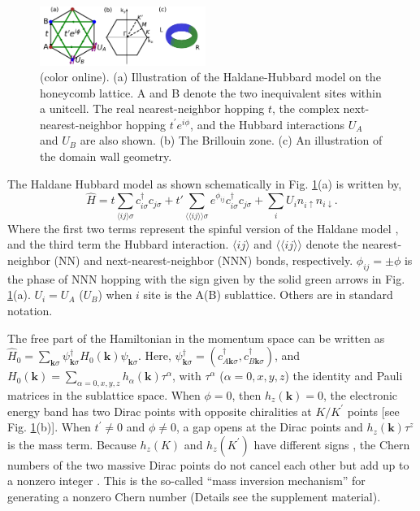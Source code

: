 \documentclass[amsmath,superscriptaddress,showpacs,aps,prl,twocolumn]{revtex4-1}
\begin{document}
\begin{figure}
\centering
\includegraphics[width=0.48\textwidth]{lattice}
\caption{(color online). (a) Illustration of the Haldane-Hubbard model on the honeycomb lattice. A and B denote the two inequivalent sites within a unitcell. The real nearest-neighbor hopping $t$, the complex next-nearest-neighbor hopping $t^\prime e^{i\phi}$, and the Hubbard interactions $U_A$ and $U_B$ are also shown. (b) The Brillouin zone. (c) An illustration of the domain wall geometry.}
\label{lattice}
\end{figure}

\par The Haldane Hubbard model as shown schematically in Fig. \ref{lattice}(a) is written by,
\begin{equation}\label{H0}
\hat{H}=t\sum_{\langle ij\rangle\sigma}c^{\dagger}_{i\sigma}c_{j\sigma}+t'\sum_{\langle\langle ij\rangle\rangle\sigma}e^{\phi_{ij}}c^{\dagger}_{i\sigma}c_{j\sigma}+
\sum_i U_i n_{i\uparrow}n_{i\downarrow}.
\end{equation}
Where the first two terms represent the spinful version of the Haldane model \cite{Haldane_PRL1988}, and the third term the Hubbard interaction. $\langle ij\rangle$ and $\langle\langle ij\rangle\rangle$ denote the nearest-neighbor (NN) and next-nearest-neighbor (NNN) bonds, respectively. $\phi_{ij}=\pm\phi$ is the phase of NNN hopping with the sign given by the solid green arrows in Fig. \ref{lattice}(a). $U_i=U_A$ ($U_B$) when $i$ site is the A(B) sublattice. Others are in standard notation.

\par The free part of the Hamiltonian in the momentum space can be written as $\hat{H}_0=\sum_{\mathbf{k}\sigma}\psi^{\dagger}_{\mathbf{k}\sigma}H_0(\mathbf{k})\psi_{\mathbf{k}\sigma}$. Here, $\psi^{\dagger}_{\mathbf{k}\sigma}=(c^{\dagger}_{A\mathbf{k}\sigma},c^{\dagger}_{B\mathbf{k}\sigma})$, and $H_0(\mathbf{k})=\sum_{\alpha=0,x,y,z}h_\alpha(\mathbf{k})\tau^\alpha$, with $\tau^\alpha$ ($\alpha=0,x,y,z$) the identity and Pauli matrices in the sublattice space. When $\phi=0$, then $h_z(\mathbf{k})=0$, the electronic energy band has two Dirac points with opposite chiralities at $K/K^\prime$ points [see Fig. \ref{lattice}(b)]. When $t^\prime\ne0$ and $\phi\ne0$, a gap opens at the Dirac points and $h_z(\mathbf{k})\tau^z$ is the mass term. Because $h_z(K)$ and $h_z(K^\prime)$ have different signs \cite{Haldane_PRL1988}, the Chern numbers of the two massive Dirac points do not cancel each other but add up to a nonzero integer \cite{Rachel_RPP2018}. This is the so-called ``mass inversion mechanism'' for generating a nonzero Chern number (Details see the supplement material).
\end{document}
